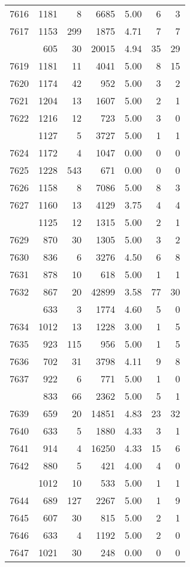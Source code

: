 \documentclass[
]{article}
\begin{document}
\begin{table}
\begin{tabular}[t]{lrrrrrr}
7616 & 1181 & 8 & 6685 & 5.00 & 6 & 3\\
7617 & 1153 & 299 & 1875 & 4.71 & 7 & 7\\
\addlinespace
7618 & 605 & 30 & 20015 & 4.94 & 35 & 29\\
7619 & 1181 & 11 & 4041 & 5.00 & 8 & 15\\
7620 & 1174 & 42 & 952 & 5.00 & 3 & 2\\
7621 & 1204 & 13 & 1607 & 5.00 & 2 & 1\\
7622 & 1216 & 12 & 723 & 5.00 & 3 & 0\\
\addlinespace
7623 & 1127 & 5 & 3727 & 5.00 & 1 & 1\\
7624 & 1172 & 4 & 1047 & 0.00 & 0 & 0\\
7625 & 1228 & 543 & 671 & 0.00 & 0 & 0\\
7626 & 1158 & 8 & 7086 & 5.00 & 8 & 3\\
7627 & 1160 & 13 & 4129 & 3.75 & 4 & 4\\
\addlinespace
7628 & 1125 & 12 & 1315 & 5.00 & 2 & 1\\
7629 & 870 & 30 & 1305 & 5.00 & 3 & 2\\
7630 & 836 & 6 & 3276 & 4.50 & 6 & 8\\
7631 & 878 & 10 & 618 & 5.00 & 1 & 1\\
7632 & 867 & 20 & 42899 & 3.58 & 77 & 30\\
\addlinespace
7633 & 633 & 3 & 1774 & 4.60 & 5 & 0\\
7634 & 1012 & 13 & 1228 & 3.00 & 1 & 5\\
7635 & 923 & 115 & 956 & 5.00 & 1 & 5\\
7636 & 702 & 31 & 3798 & 4.11 & 9 & 8\\
7637 & 922 & 6 & 771 & 5.00 & 1 & 0\\
\addlinespace
7638 & 833 & 66 & 2362 & 5.00 & 5 & 1\\
7639 & 659 & 20 & 14851 & 4.83 & 23 & 32\\
7640 & 633 & 5 & 1880 & 4.33 & 3 & 1\\
7641 & 914 & 4 & 16250 & 4.33 & 15 & 6\\
7642 & 880 & 5 & 421 & 4.00 & 4 & 0\\
\addlinespace
7643 & 1012 & 10 & 533 & 5.00 & 1 & 1\\
7644 & 689 & 127 & 2267 & 5.00 & 1 & 9\\
7645 & 607 & 30 & 815 & 5.00 & 2 & 1\\
7646 & 633 & 4 & 1192 & 5.00 & 2 & 0\\
7647 & 1021 & 30 & 248 & 0.00 & 0 & 0\\

\end{tabular}
\end{table}
\end{document}
